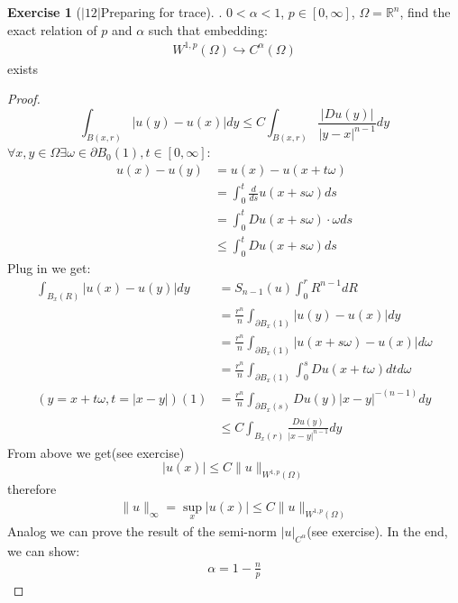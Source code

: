 \documentclass[a4paper,11pt,oneside,fleqn]{book}
\theoremstyle{definition}
\newtheorem{exercise}{Exercise}[chapter]
\theoremstyle{remark}
\begin{document}
\begin{exercise}[$|12|$Preparing for trace].
$0<\alpha<1$, $p \in [0, \infty]$, $\Omega = \mathbb{R}^n$, find the exact relation of $p$ and $\alpha$ such that embedding:
\begin{align*}
	W^{1, p}(\Omega) \hookrightarrow C^{\alpha}(\Omega)
\end{align*}
exists
\begin{proof}
\begin{equation}
\int_{B(x, r)} |u(y) - u(x)|dy \leq C \int_{B(x, r)} \frac{|Du(y)|}{|y-x|^{n-1}}dy	
\end{equation}
$\forall x, y \in \Omega \exists \omega \in \partial B_0(1), t \in [0, \infty] $:
\begin{align*}
	u(x) - u(y) &= u(x) - u(x + t\omega) \\
	&= \int_0^t \frac{d}{ds} u(x + s\omega) ds \\
	&= \int_0^t D u(x + s\omega) \cdot \omega ds\\
	&\leq \int_0^t Du (x + s\omega) ds
\end{align*}
Plug in we get:
\begin{align*}
	\int_{B_x(R)}| u(x) - u(y)|dy &= S_{n -1}(u) \int_0^r R^{n-1} dR\\
	&=  \frac{r^n}{n} \int_{\partial B_x(1)} |u(y) - u(x)| dy \\
	&= \frac{r^n}{n} \int_{\partial B_x(1)} |u(x + s\omega) - u(x)|d\omega \\
	&= \frac{r^n}{n} \int_{\partial B_x(1)} \int_0^s Du(x + t\omega)dt d\omega \\
	(y = x + t\omega, t = |x -y|)(1)
	&= \frac{r^n}{n}  \int_{\partial B_x(s)} Du(y)|x - y|^{-(n-1)}dy \\
	&\leq C \int_{B_x(r)} \frac{Du(y)}{|x - y|^{n-1}}dy
\end{align*}
From above we get(see exercise)
\begin{equation}
|u(x)| \leq C \|u\|_{W^{1,p}(\Omega)}	
\end{equation}
therefore
\begin{align*}
	\|u\|_\infty = \sup_x |u(x)| \leq C \|u\|_{W^{1, p}(\Omega)}
\end{align*}
Analog we can prove the result of the semi-norm $|u|_{C^{\alpha}}$(see exercise). In the end, we can show:
\begin{align*}
	\alpha = 1 - \frac{n}{p}
\end{align*} 
\end{proof}
\end{exercise}
\end{document}
